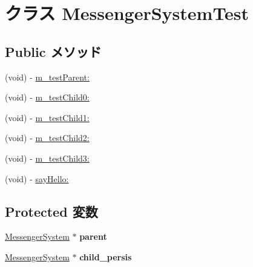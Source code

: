 \hypertarget{interface_messenger_system_test}{
\section{クラス MessengerSystemTest}
\label{d9/d39/interface_messenger_system_test}
}
\subsection*{Public メソッド}
\begin{DoxyCompactItemize}
\item 
(void) -\/ \hyperlink{interface_messenger_system_test_ac0b879fa2580ba6ae8e38655e6dfe838}{m\_\-testParent:}
\item 
(void) -\/ \hyperlink{interface_messenger_system_test_ab2b931ec9d4901e4fd60204e53fc61e7}{m\_\-testChild0:}
\item 
(void) -\/ \hyperlink{interface_messenger_system_test_aa3be3d8e130514372c9f750349b09a6b}{m\_\-testChild1:}
\item 
(void) -\/ \hyperlink{interface_messenger_system_test_a213b69ccc26d68c90b5455e15a7d6f36}{m\_\-testChild2:}
\item 
(void) -\/ \hyperlink{interface_messenger_system_test_ae378e9658aad05348adabeaeb1bf5b8b}{m\_\-testChild3:}
\item 
(void) -\/ \hyperlink{interface_messenger_system_test_aa6fd027edc00a037b30c04fbd581d151}{sayHello:}
\end{DoxyCompactItemize}
\subsection*{Protected 変数}
\begin{DoxyCompactItemize}
\item 
\hypertarget{interface_messenger_system_test_a57f49a12dbb0f4646ce7fa967b75bb1d}{
\hyperlink{interface_messenger_system}{MessengerSystem} $\ast$ {\bfseries parent}}
\label{d9/d39/interface_messenger_system_test_a57f49a12dbb0f4646ce7fa967b75bb1d}

\item 
\hypertarget{interface_messenger_system_test_a1ca38f6c6413aad838893e66b4bf79be}{
\hyperlink{interface_messenger_system}{MessengerSystem} $\ast$ {\bfseries child\_\-persis}}
\label{d9/d39/interface_messenger_system_test_a1ca38f6c6413aad838893e66b4bf79be}

\end{DoxyCompactItemize}


